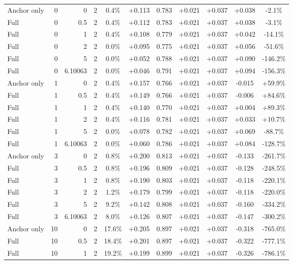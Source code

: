 \begin{table}[htbp]
\begin{tabular}{lrrrccccccc}
Anchor only & 0 & 0 & 2 & 0.4\% & +0.113 & 0.783 & +0.021 & +0.037 & +0.038 & -2.1\% \\
Full & 0 & 0.5 & 2 & 0.4\% & +0.112 & 0.783 & +0.021 & +0.037 & +0.038 & -3.1\% \\
Full & 0 & 1 & 2 & 0.4\% & +0.108 & 0.779 & +0.021 & +0.037 & +0.042 & -14.1\% \\
Full & 0 & 2 & 2 & 0.0\% & +0.095 & 0.775 & +0.021 & +0.037 & +0.056 & -51.6\% \\
Full & 0 & 5 & 2 & 0.0\% & +0.052 & 0.788 & +0.021 & +0.037 & +0.090 & -146.2\% \\
Full & 0 & 6.10063 & 2 & 0.0\% & +0.046 & 0.791 & +0.021 & +0.037 & +0.094 & -156.3\% \\
Anchor only & 1 & 0 & 2 & 0.4\% & +0.157 & 0.766 & +0.021 & +0.037 & -0.015 & +59.9\% \\
Full & 1 & 0.5 & 2 & 0.4\% & +0.149 & 0.766 & +0.021 & +0.037 & -0.006 & +84.6\% \\
Full & 1 & 1 & 2 & 0.4\% & +0.140 & 0.770 & +0.021 & +0.037 & +0.004 & +89.3\% \\
Full & 1 & 2 & 2 & 0.4\% & +0.116 & 0.781 & +0.021 & +0.037 & +0.033 & +10.7\% \\
Full & 1 & 5 & 2 & 0.0\% & +0.078 & 0.782 & +0.021 & +0.037 & +0.069 & -88.7\% \\
Full & 1 & 6.10063 & 2 & 0.0\% & +0.060 & 0.786 & +0.021 & +0.037 & +0.084 & -128.7\% \\
Anchor only & 3 & 0 & 2 & 0.8\% & +0.200 & 0.813 & +0.021 & +0.037 & -0.133 & -261.7\% \\
Full & 3 & 0.5 & 2 & 0.8\% & +0.196 & 0.809 & +0.021 & +0.037 & -0.128 & -248.5\% \\
Full & 3 & 1 & 2 & 0.8\% & +0.190 & 0.803 & +0.021 & +0.037 & -0.118 & -220.1\% \\
Full & 3 & 2 & 2 & 1.2\% & +0.179 & 0.799 & +0.021 & +0.037 & -0.118 & -220.0\% \\
Full & 3 & 5 & 2 & 9.2\% & +0.142 & 0.808 & +0.021 & +0.037 & -0.160 & -334.2\% \\
Full & 3 & 6.10063 & 2 & 8.0\% & +0.126 & 0.807 & +0.021 & +0.037 & -0.147 & -300.2\% \\
Anchor only & 10 & 0 & 2 & 17.6\% & +0.205 & 0.897 & +0.021 & +0.037 & -0.318 & -765.0\% \\
Full & 10 & 0.5 & 2 & 18.4\% & +0.201 & 0.897 & +0.021 & +0.037 & -0.322 & -777.1\% \\
Full & 10 & 1 & 2 & 19.2\% & +0.199 & 0.899 & +0.021 & +0.037 & -0.326 & -786.1\% \\

\end{tabular}
\end{table}
